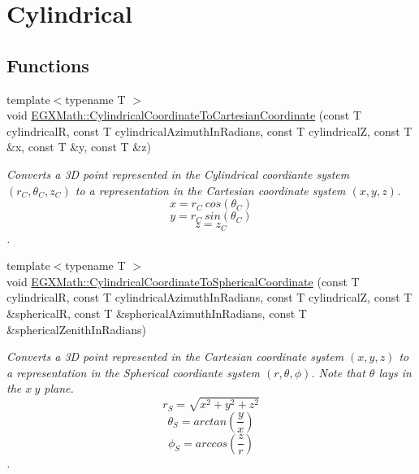 \hypertarget{group___e_g_x_math-_conversions-_coordinate_conversions-3_d-_cylindrical}{}\section{Cylindrical}
\label{group___e_g_x_math-_conversions-_coordinate_conversions-3_d-_cylindrical}
\subsection*{Functions}
\begin{DoxyCompactItemize}
\item 
{\footnotesize template$<$typename T $>$ }\\void \mbox{\hyperlink{group___e_g_x_math-_conversions-_coordinate_conversions-3_d-_cylindrical_gafaf535c9c6d2f0b4cfd9fa975d26ed4f}{E\+G\+X\+Math\+::\+Cylindrical\+Coordinate\+To\+Cartesian\+Coordinate}} (const T cylindricalR, const T cylindrical\+Azimuth\+In\+Radians, const T cylindricalZ, const T \&x, const T \&y, const T \&z)
\begin{DoxyCompactList}\small\item\em Converts a 3D point represented in the Cylindrical coordiante system $(r_C,\theta_C,z_C)$ to a representation in the Cartesian coordinate system $(x,y,z)$. \[ x = r_C\ cos(\theta_C) \] \[ y = r_C\ sin(\theta_C) \] \[ z = z_C \]. \end{DoxyCompactList}\item 
{\footnotesize template$<$typename T $>$ }\\void \mbox{\hyperlink{group___e_g_x_math-_conversions-_coordinate_conversions-3_d-_cylindrical_ga908345274abd7e315373a9eb56f2ba7f}{E\+G\+X\+Math\+::\+Cylindrical\+Coordinate\+To\+Spherical\+Coordinate}} (const T cylindricalR, const T cylindrical\+Azimuth\+In\+Radians, const T cylindricalZ, const T \&sphericalR, const T \&spherical\+Azimuth\+In\+Radians, const T \&spherical\+Zenith\+In\+Radians)
\begin{DoxyCompactList}\small\item\em Converts a 3D point represented in the Cartesian coordinate system $(x,y,z)$ to a representation in the Spherical coordiante system $(r,\theta,\phi)$. Note that $\theta$ lays in the $x\ y$ plane. \[ r_S = \sqrt{x^2+y^2+z^2} \] \[ \theta_S = arctan(\frac{y}{x}) \] \[ \phi_S = arccos(\frac{z}{r}) \]. \end{DoxyCompactList}\end{DoxyCompactItemize}


